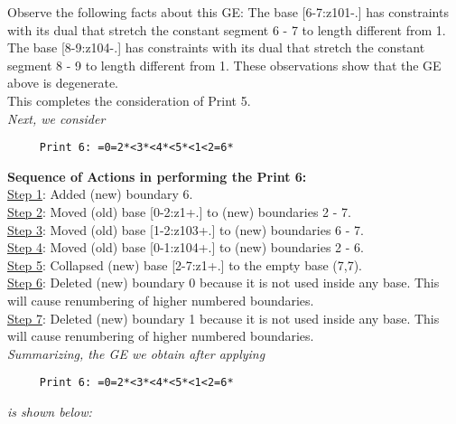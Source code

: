 \documentclass[final]{article}
\begin{document}
Observe the following facts about this GE:
The base [6-7:z101-.]  has constraints with its dual that stretch the constant segment 6 - 7 to length different from 1.  The base [8-9:z104-.]  has constraints with its dual that stretch the constant segment 8 - 9 to length different from 1.  These observations show that the GE above is degenerate.\\[0.1in]
This completes the consideration of Print 5.\\[0.1in]
{\em Next, we consider}
\begin{verbatim}
     Print 6: =0=2*<3*<4*<5*<1<2=6*
\end{verbatim}
{\bf Sequence of Actions in performing the Print 6:}\\
{\underline{Step 1}:} Added (new) boundary 6.\\
{\underline{Step 2}:} Moved (old) base [0-2:z1+.]  to (new) boundaries 2 - 7.\\
{\underline{Step 3}:} Moved (old) base [1-2:z103+.]  to (new) boundaries 6 - 7.\\
{\underline{Step 4}:} Moved (old) base [0-1:z104+.]  to (new) boundaries 2 - 6.\\
{\underline{Step 5}:} Collapsed (new) base [2-7:z1+.]  to the empty base (7,7).
\\
{\underline{Step 6}:} Deleted (new) boundary 0 because it is not used inside any base.  This will cause renumbering of higher numbered boundaries.
\\
{\underline{Step 7}:} Deleted (new) boundary 1 because it is not used inside any base.  This will cause renumbering of higher numbered boundaries.
\\[0.1in]
{\em Summarizing, the GE we obtain after applying}
\begin{verbatim}
     Print 6: =0=2*<3*<4*<5*<1<2=6*
\end{verbatim}
{\em is shown below:}
\end{document}
